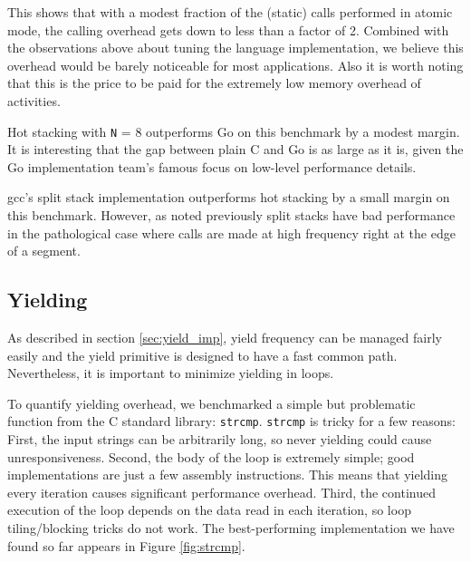 \documentclass[acmsmall,anonymous,review]{acmart}\settopmatter{printfolios=true,printccs=false,printacmref=false}
\begin{document}

This shows that with a modest fraction of the (static) calls performed in atomic mode, the calling overhead gets down to less than a factor of 2.
Combined with the observations above about tuning the language implementation, we believe this overhead would be barely noticeable for most applications.
Also it is worth noting that this is the price to be paid for the extremely low memory overhead of activities.

Hot stacking with \texttt{N} = 8 outperforms Go on this benchmark by a modest margin.
It is interesting that the gap between plain C and Go is as large as it is, given the Go implementation team's famous focus on low-level performance details.

gcc's split stack implementation outperforms hot stacking by a small margin on this benchmark.
However, as noted previously split stacks have bad performance in the pathological case where calls are made at high frequency right at the edge of a segment.

\subsection{Yielding}

As described in section \ref{sec:yield_imp}, yield frequency can be managed fairly easily and the yield primitive is designed to have a fast common path.
Nevertheless, it is important to minimize yielding in loops.

To quantify yielding overhead, we benchmarked a simple but problematic function from the C standard library: \texttt{strcmp}.
\texttt{strcmp} is tricky for a few reasons:
First, the input strings can be arbitrarily long, so never yielding could cause unresponsiveness.
Second, the body of the loop is extremely simple; good implementations are just a few assembly instructions.
This means that yielding every iteration causes significant performance overhead.
Third, the continued execution of the loop depends on the data read in each iteration, so loop tiling/blocking tricks do not work.
The best-performing implementation we have found so far appears in Figure \ref{fig:strcmp}.
\end{document}
